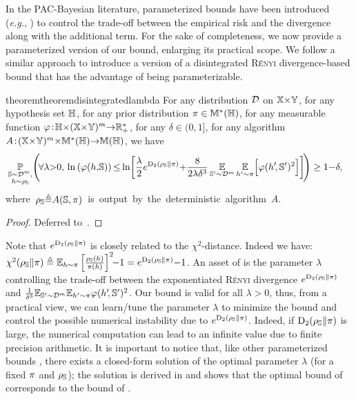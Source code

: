 In the PAC-Bayesian literature, parameterized bounds have been introduced ({\it e.g.}, \citet{Catoni2007, ThiemannIgelWintenbergerSeldin2017}) to control the trade-off  between the empirical risk and the divergence along with the additional term. 
For the sake of completeness, we now provide a parameterized version of our bound, enlarging its practical scope.
 We follow a similar approach to introduce a version of a disintegrated \textsc{Rényi} divergence-based bound that has the advantage of being parameterizable.
\begin{restatable}{theorem}{theoremdisintegratedlambda} For any distribution $\D$ on $\X{\times}\Y$, for any hypothesis set $\H$, for any prior distribution $\P\in\M^{*}(\H)$, for any measurable function \mbox{$\varphi\!:\! \H{\times}(\X{\times}\Y)^{\m}{\to} \Rbb_{+}^*$}, for any $\delta\in(0,1]$, for any algorithm \mbox{$A\!:\!(\X{\times}\Y)^{\m}{\times}\M^{*}(\H){\to} \M(\H)$}, we have
\begin{align*}
&\PP_{\substack{\S\sim\D^{\m},\\\h\sim \AQ}} \!\Bigg(\!\forall\lambda{>}0,\,\ln\LP\varphi(\h,\!\S)\RP{\le} \ln\!\bigg[
\frac\lambda 2\displaystyle e^{\Renyi_{2}(\AQ\|\P)}{+} \frac{8}{2\lambda\delta^3}\EE_{\S'{\sim}\D^{\m}}\EE_{\h'{\sim}\P}\!\Big[\varphi(\h'\!, \S')^2\Big]
\bigg]\!\Bigg)\ge1{-}\delta,
\end{align*}
\mbox{where $\AQ{\defeq}A(\S,\P)$ is output by the deterministic algorithm $A$}. 
\label{chap:dis-pra:theorem:disintegrated-lambda} 
\end{restatable}
\begin{noaddcontents}\begin{proof}
Deferred to~.
\end{proof}\end{noaddcontents}

Note that $e^{\Renyi_{2}(\AQ\|\P)}$ is closely related to the $\chi^2$-distance. Indeed we have: $\chi^2(\AQ\|\P) \defeq \EE_{\h\sim\P}\LB\tfrac{\AQ(\h)}{\P(\h)}\RB^2\!\!{-}1 = e^{\Renyi_{2}(\AQ\|\P)} {-}1$.
An asset of  is the parameter $\lambda$ controlling the trade-off between the exponentiated \textsc{Rényi} divergence $e^{\Renyi_{2}(\AQ\|\P)}$ and $\frac{1}{\delta^3}{\EE}_{\S'{\sim}\D^{\m}}{\EE}_{\h'{\sim}\P}\varphi(\h'\!, \S')^2$.
Our bound is valid for all \mbox{$\lambda\!>\!0$}, thus, from a practical view, we can learn/tune the parameter $\lambda$ to minimize the bound and control the possible numerical instability due to  $e^{\Renyi_{2}(\AQ\|\P)}$.
Indeed, if $\Renyi_{2}(\AQ\|\P)$ is large, the numerical computation can lead to an infinite value due to finite precision arithmetic.
It is important to notice that, like other parameterized bounds \citep[\eg,][]{ThiemannIgelWintenbergerSeldin2017}, there exists a closed-form solution of the optimal parameter $\lambda$ (for a fixed $\P$ and $ \AQ$); the solution is derived in  and shows that the optimal bound of  corresponds to the bound of .

